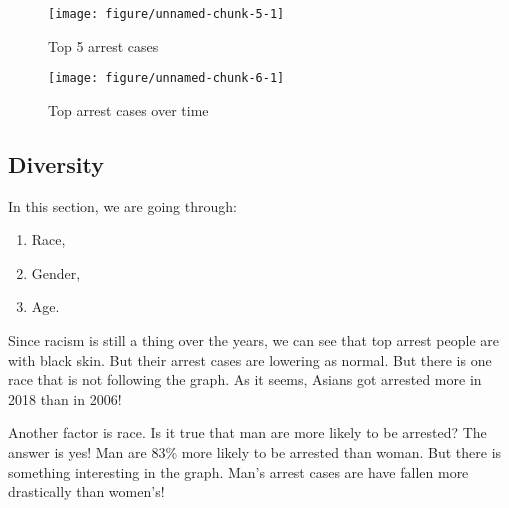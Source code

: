 \documentclass{article}\usepackage[]{graphicx}\usepackage[]{color}
\makeatletter
\def\maxwidth{ %
  \ifdim\Gin@nat@width>\linewidth
    \linewidth
  \else
    \Gin@nat@width
  \fi
}
\newenvironment{knitrout}{}{} %
\makeatother
\begin{document}
    \newpage
      \begin{figure}[hbtp]
        \caption{Top 5 arrest cases}
\begin{knitrout}
\color{fgcolor}
\texttt{[image: figure/unnamed-chunk-5-1]} 

\end{knitrout}
      \end{figure}
      
      \begin{figure}[hbtp]
        \caption{Top arrest cases over time}
\begin{knitrout}
\color{fgcolor}
\texttt{[image: figure/unnamed-chunk-6-1]} 

\end{knitrout}
      \end{figure}
      
  \maketitle
    \newpage
      \subsection{Diversity}
        In this section, we are going through: 
        \begin{enumerate}
          \item
            Race,
          \item
          	Gender,
          \item
          	Age.
        \end{enumerate}
  
        Since racism is still a thing over the years, we can see that top arrest people are with black            skin. But their arrest cases are lowering as normal. But there is one race that is not following          the graph. As it seems, Asians got arrested more in 2018 than in 2006!\

        Another factor is race. Is it true that man are more likely to be arrested? The answer is yes! Man         are 83\% more likely to be arrested than woman. But there is something interesting in the graph.          Man’s arrest cases are have fallen more drastically than women’s!
\end{document}
